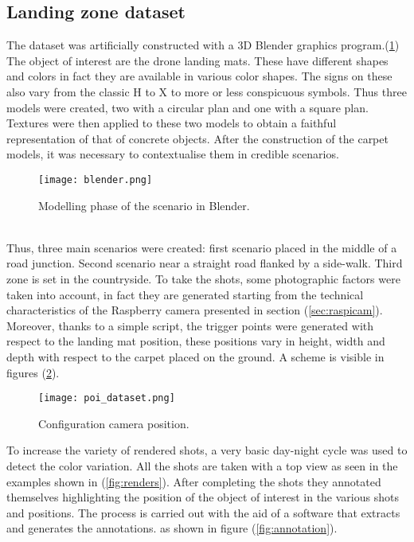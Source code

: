 \subsection{Landing zone dataset}
\label{ssec:landing-zone}
%
The dataset was artificially constructed with a 3D Blender graphics program.(\ref{fig:blender})\\ 
The object of interest are the drone landing mats. These have different shapes
and colors in fact they are available in various color shapes. The signs on
these also vary from the classic H to X to more or less conspicuous symbols.
Thus three models were created, two with a circular plan and one with a square
plan. Textures were then applied to these two models to obtain a faithful
representation of that of concrete objects. \hfill \break
After the construction of the carpet models, it was necessary to contextualise 
them in credible scenarios. \hfill \break
%
\begin{figure}[htb]
	\centering
	\texttt{[image: blender.png]}
	\caption{Modelling phase of the scenario in Blender.}
	\label{fig:blender}
\end{figure}
%
\\Thus, three main scenarios were created: first scenario placed in the middle of a road
junction. Second scenario near a straight road flanked by a side-walk.
Third zone is set in the countryside. To take the shots, some photographic
factors were taken into account, in fact they are generated starting from the
technical characteristics of the Raspberry camera presented in section
(\ref{sec:raspicam}). Moreover, thanks to a simple script, the trigger points
were generated with respect to the landing mat position, these positions vary in
height, width and depth with respect to the carpet placed on the ground.
A scheme is visible in figures (\ref{fig:poi_dataset}). \hfill \break
%
\begin{figure}[htb]
	\centering
	\texttt{[image: poi\_dataset.png]}
	\caption{Configuration camera position.}
	\label{fig:poi_dataset}
\end{figure}
%
\newpage
To increase the variety of rendered shots, a very basic day-night cycle was
used to detect the color variation. All the shots are taken with a top view as
seen in the examples shown in (\ref{fig:renders}).
After completing the shots they annotated themselves highlighting the position
of the object of interest in the various shots and positions.
The process is carried out with the aid of a software that extracts and
generates the annotations. as shown in figure (\ref{fig:annotation}).
